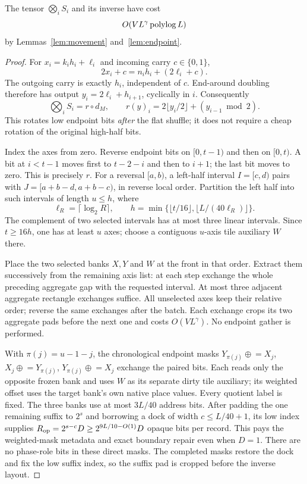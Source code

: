 \begin{lemma}
\label{lem:shuffle}
The tensor $\bigotimes_i S_i$ and its inverse have cost
\[O(VL^\gamma\operatorname{polylog} L)\]
by Lemmas~\ref{lem:movement}
and~\ref{lem:endpoint}.
\end{lemma}
\begin{proof}
For $x_i=k_i h_i+\ell_i$ and incoming carry $c\in\{0,1\}$,
\[
 2x_i+c=n_i h_i+(2\ell_i+c).
\]
The outgoing carry is exactly $h_i$, independent of $c$.
End-around doubling therefore has output
$y_i=2\ell_i+h_{i+1}$, cyclically in $i$.
Consequently
\[
 \bigotimes_i S_i=r\circ d_M,\qquad
 r(y)_i=2\lfloor y_i/2\rfloor+(y_{i-1}\bmod2).
\]
This rotates low endpoint bits \emph{after} the flat shuffle; it does
not require a cheap rotation of the original high-half bits.

Index the axes from zero. Reverse endpoint bits on $[0,t-1)$ and then
on $[0,t)$. A bit at $i<t-1$ moves first to $t-2-i$ and then to $i+1$;
the last bit moves to zero. This is precisely $r$. For a reversal
$[a,b)$, a left-half interval $I=[c,d)$ pairs with
$J=[a+b-d,a+b-c)$, in reverse local order. Partition the left half
into such intervals of length $u\le h$, where
\[
 \ell_R=\lceil\log_2R\rceil,\qquad
 h=\min\{\lfloor t/16\rfloor,\lfloor L/(40\ell_R)\rfloor\}.
\]
The complement of two selected intervals has at most three linear
intervals. Since $t\ge16h$, one has at least $u$ axes; choose a
contiguous $u$-axis tile auxiliary $W$ there.

Place the two selected banks $X,Y$ and $W$ at the front in that order.
Extract them successively from the remaining axis list: at each step
exchange the whole preceding aggregate gap with the requested interval.
At most three adjacent aggregate rectangle exchanges suffice. All
unselected axes keep their relative order; reverse the same exchanges
after the batch. Each exchange crops its two aggregate pads before the
next one and costs $O(VL^\gamma)$. No endpoint gather is performed.

With $\pi(j)=u-1-j$, the chronological endpoint masks
$Y_{\pi(j)}\mathrel{\oplus}=X_j$,
$X_j\mathrel{\oplus}=Y_{\pi(j)}$,
$Y_{\pi(j)}\mathrel{\oplus}=X_j$
exchange the paired bits. Each reads only the opposite frozen bank
and uses $W$ as its separate dirty tile auxiliary; its weighted offset
uses the target bank's own native place values. Every quotient label
is fixed. The three banks use at most $3L/40$ address bits. After
padding the one remaining suffix to $2^s$ and borrowing a dock of
width $c\le L/40+1$, its low index supplies
$R_{\rm op}=2^{s-c}D\ge2^{9L/10-O(1)}D$ opaque bits per record.
This pays the weighted-mask metadata and exact boundary repair even
when $D=1$. There are no phase-role bits in these direct masks.
The completed masks restore the dock and fix the low suffix index,
so the suffix pad is cropped before the inverse layout.


\end{proof}
